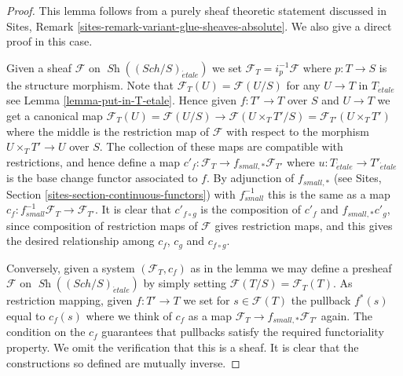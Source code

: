 \documentclass{stacks-project}
\theoremstyle{plain}
\theoremstyle{definition}
\theoremstyle{remark}
\numberwithin{equation}{subsection}
\def\Sch{\mathit{Sch}}
\def\Sh{\mathop{\mathit{Sh}}\nolimits}
\def\etale{{\acute{e}tale}}
\begin{document}
\begin{proof}
This lemma follows from a purely sheaf theoretic statement discussed
in Sites, Remark \ref{sites-remark-variant-glue-sheaves-absolute}.
We also give a direct proof in this case.

\medskip\noindent
Given a sheaf $\mathcal{F}$ on $\Sh((\Sch/S)_\etale)$
we set $\mathcal{F}_T = i_p^{-1}\mathcal{F}$ where $p : T \to S$
is the structure morphism. Note that
$\mathcal{F}_T(U) = \mathcal{F}(U/S)$ for any $U \to T$
in $T_\etale$ see Lemma \ref{lemma-put-in-T-etale}.
Hence given $f : T' \to T$ over $S$ and $U \to T$ we get a canonical
map $\mathcal{F}_T(U) = \mathcal{F}(U/S) \to \mathcal{F}(U \times_T T'/S)
= \mathcal{F}_{T'}(U \times_T T')$ where the middle is the restriction map
of $\mathcal{F}$ with respect to the morphism
$U \times_T T' \to U$ over $S$. The collection of these maps are
compatible with restrictions, and hence define a map
$c'_f : \mathcal{F}_T \to f_{small, *}\mathcal{F}_{T'}$ where
$u : T_\etale \to T'_\etale$ is the base change functor
associated to $f$. By adjunction of $f_{small, *}$ (see
Sites, Section \ref{sites-section-continuous-functors}) with
$f_{small}^{-1}$ this is the same as a map
$c_f : f_{small}^{-1}\mathcal{F}_T \to \mathcal{F}_{T'}$.
It is clear that $c'_{f \circ g}$ is the composition of
$c'_f$ and $f_{small, *}c'_g$, since composition of restriction maps
of $\mathcal{F}$ gives restriction maps, and this gives the desired
relationship among $c_f$, $c_g$ and $c_{f \circ g}$.

\medskip\noindent
Conversely, given a system $(\mathcal{F}_T, c_f)$ as in the lemma
we may define a presheaf $\mathcal{F}$ on
$\Sh((\Sch/S)_\etale)$
by simply setting $\mathcal{F}(T/S) = \mathcal{F}_T(T)$. As restriction
mapping, given $f : T' \to T$ we set for $s \in \mathcal{F}(T)$
the pullback $f^*(s)$ equal to $c_f(s)$ where we think of $c_f$ as
a map $\mathcal{F}_T \to f_{small, *}\mathcal{F}_{T'}$ again.
The condition on the $c_f$ guarantees that
pullbacks satisfy the required functoriality property.
We omit the verification that this is a sheaf.
It is clear that the constructions so defined are mutually inverse.
\end{proof}
\end{document}
